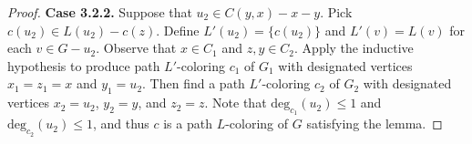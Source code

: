 \documentclass[12pt,letterpaper]{article}
\theoremstyle{plain}
\theoremstyle{definition}
\theoremstyle{break}
\begin{document}
\begin{proof}
%
%
%
%
%
%
%

\textbf{Case 3.2.2.}
Suppose that $u_2\in C(y,x)-x-y$. Pick $c(u_2)\in L(u_2)-c(z)$. Define
$L'(u_2)=\{c(u_2)\}$ and $L'(v)=L(v)$ for each $v\in G-u_2$. 
Observe that
$x\in C_1$ and $z,y\in C_2$. Apply the inductive hypothesis to produce path
$L'$-coloring $c_1$ of
$G_1$ with designated vertices $x_1=z_1=x$ and $y_1=u_2$.
Then find a path
$L'$-coloring $c_2$ of $G_2$ with designated vertices $x_2=u_2$, $y_2=y$, and
$z_2=z$. Note that $\text{deg}_{c_1}(u_2)\le 1$ and
$\text{deg}_{c_2}(u_2)\le 1$, and thus $c$ is a path $L$-coloring of $G$
satisfying the lemma.


\end{proof}
\end{document}
